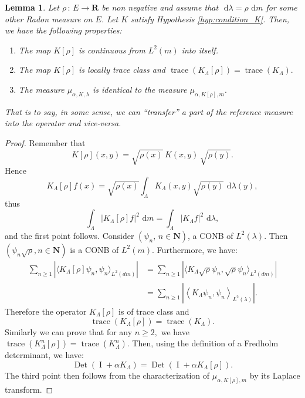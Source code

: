 \documentclass[11pt,a4paper]{amsart}
\newtheorem{Lemma}{Lemma}
\begin{document}
\begin{Lemma}
  \label{lem:chgt_mesure_operateur}
  Let $\rho\, :\, E\to {{\mathbf R}}$ be non negative and assume that
  ${\text{ d}}\lambda=\rho{\text{ d}} m$ for some other Radon measure on $E$. Let $K$
  satisfy Hypothesis \ref{hyp:condition_K}. Then, we have the
  following properties:
  \begin{enumerate}
  \item The map $K[\rho]$ is continuous from $L^2(m)$ into itself.
  \item The map $K[\rho]$ is locally trace class and ${\operatorname{trace}}(K
    _\Lambda[\rho])={\operatorname{trace}}(K_\Lambda).$
  \item The measure $\mu_{\alpha, K, \lambda}$ is identical to the
    measure $\mu_{\alpha, K[\rho],m}.$
  \end{enumerate}
  That is to say, in some sense, we can ``transfer'' a part of the
  reference measure into the operator and vice-versa.
\end{Lemma}
\begin{proof}
  Remember that
  \begin{equation*}
    K[\rho] (x,y)=\sqrt{\rho(x)}\, K(x,y)\,\sqrt{\rho(y)}.
  \end{equation*}
  Hence
  \begin{equation*}
    K_{\Lambda}[\rho] f(x)=\sqrt{\rho(x)}\int_\Lambda
    K_{\Lambda}(x,y)\sqrt{\rho(y)}{\text{ d}} \lambda(y),
  \end{equation*}
  thus
  \begin{equation*}
    \int_\Lambda |K_{\Lambda}[\rho] f|^2 {\text{ d}} m=\int_\Lambda |K_{\Lambda} f|^2 {\text{ d}} \lambda,
  \end{equation*}
  and the first point follows.  Consider $(\psi_n,\, n \in {{\mathbf N}})$, a
  CONB of $L^2(\lambda)$. Then $({\psi_n}{\sqrt{\rho}}, n \in {{\mathbf N}})$ is
  a CONB of $L^2(m)$. Furthermore, we have:
  \begin{align*}
    \sum_{n\geq 1}\left|\langle K_{\Lambda}[\rho]
      \psi_n,\psi_n\rangle_{L^2(dm)}\right|&=\sum_{n\geq
      1}\left|\langle K_{\Lambda}\sqrt{\rho}
      \psi_n,\sqrt{\rho}\psi_n\rangle_{L^2(dm)}\right|\\
    &=\sum_{n\geq 1}\left|\left\langle K_{\Lambda}
        {\psi_n},{\psi_n}\right\rangle_{L^2(\lambda)}\right|.
  \end{align*}
  Therefore the operator $K_{\Lambda}[\rho]$ is of trace class and
  \begin{equation*}
    {\operatorname{trace}}(K_{\Lambda}[\rho])={\operatorname{trace}}(K_{\Lambda}).
  \end{equation*}
  Similarly we can prove that for any $n \geq 2,$ we have
  ${\operatorname{trace}}(K^n_{\Lambda}[\rho])={\operatorname{trace}}(K^n_{\Lambda})$. Then, using the
  definition of a Fredholm determinant, we have:
  \begin{equation*}
    {\operatorname{Det}}({\operatorname{I}}+\alpha K_{\Lambda})={\operatorname{Det}}({\operatorname{I}}+\alpha K_{\Lambda}[\rho]).
  \end{equation*}
  The third point then follows from the characterization of
  $\mu_{\alpha, K[\rho],m}$ by its Laplace transform.
\end{proof}
\end{document}

